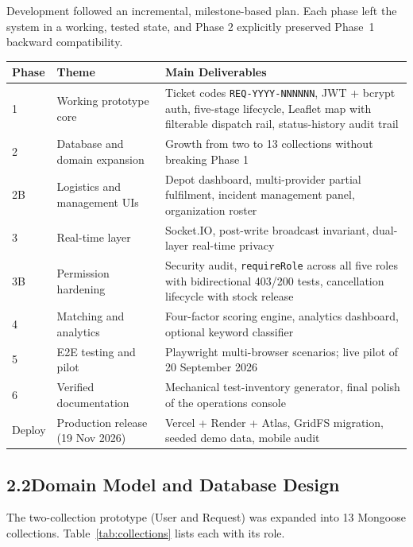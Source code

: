 \documentclass[11pt,a4paper]{article}
\newcommand{\tc}[1]{\texttt{\small #1}}
\begin{document}
Development followed an incremental, milestone-based plan. Each phase left the system in a working, tested state, and Phase 2 explicitly preserved Phase~1 backward compatibility.

\renewcommand{\arraystretch}{1.2}
\begin{tabularx}{\textwidth}{@{}p{0.75in}p{1.85in}X@{}}
\toprule
\textbf{Phase} & \textbf{Theme} & \textbf{Main Deliverables}\\
\midrule
1 & Working prototype core & Ticket codes \tc{REQ-YYYY-NNNNNN}, JWT + bcrypt auth, five-stage lifecycle, Leaflet map with filterable dispatch rail, status-history audit trail\\
2 & Database and domain expansion & Growth from two to 13 collections without breaking Phase 1\\
2B & Logistics and management UIs & Depot dashboard, multi-provider partial fulfilment, incident management panel, organization roster\\
3 & Real-time layer & Socket.IO, post-write broadcast invariant, dual-layer real-time privacy\\
3B & Permission hardening & Security audit, \tc{requireRole} across all five roles with bidirectional 403/200 tests, cancellation lifecycle with stock release\\
4 & Matching and analytics & Four-factor scoring engine, analytics dashboard, optional keyword classifier\\
5 & E2E testing and pilot & Playwright multi-browser scenarios; live pilot of 20 September 2026\\
6 & Verified documentation & Mechanical test-inventory generator, final polish of the operations console\\
Deploy & Production release (19 Nov 2026) & Vercel + Render + Atlas, GridFS migration, seeded demo data, mobile audit\\
\bottomrule
\end{tabularx}
\renewcommand{\arraystretch}{1}

\subsection{2.2\quad Domain Model and Database Design}\label{s22}

The two-collection prototype (User and Request) was expanded into 13 Mongoose collections. Table~\ref{tab:collections} lists each with its role.
\end{document}
